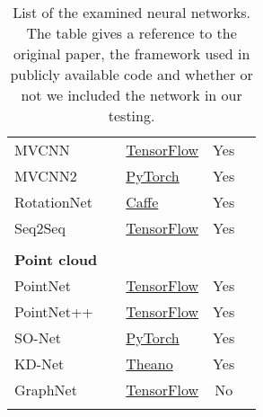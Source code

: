 \begin{table}[]
\begin{tabular}{lllcc}
		MVCNN                  & \cite{su_multi-view_2015}                & \href{https://github.com/WeiTang114/MVCNN-TensorFlow}{TensorFlow}                      &     Yes     &  \\
		MVCNN2                 & \cite{su_deeper_2018}                    & \href{https://github.com/jongchyisu/mvcnn_pytorch}{PyTorch}                            &     Yes     &  \\
		RotationNet            & \cite{kanezaki_rotationnet:_2018}        & \href{https://github.com/kanezaki/rotationnet}{Caffe}                                  &     Yes     &  \\
		Seq2Seq                & \cite{zhizhong_seqviews2seqlabels:_2018} & \href{https://github.com/mingyangShang/SeqViews2SeqLabels}{TensorFlow}                 &     Yes     &  \\
		                       &                                          &                                                                                        &             &  \\
		\textbf{Point cloud  } &                                          &                                                                                        &             &  \\
		PointNet               & \cite{qi_pointnet:_2016}                 & \href{https://github.com/charlesq34/pointnet}{TensorFlow}                              &     Yes     &  \\
		PointNet++             & \cite{qi_pointnet++:_2017}               & \href{https://github.com/charlesq34/pointnet2}{TensorFlow}                             &     Yes     &  \\
		SO-Net                 & \cite{li_so-net:_2018}                   & \href{https://github.com/lijx10/SO-Net}{PyTorch}                                       &     Yes     &  \\
		KD-Net                 & \cite{klokov_escape_2017}                & \href{https://github.com/Regenerator/kdnets}{Theano}                                   &     Yes     &  \\
		GraphNet               & \cite{dominguez_general-purpose_2018}    & \href{https://github.com/WDot/G3DNet}{TensorFlow}                                      &     No      &  \\
		                       &                                          &                                                                                        &             &  \\ \hline
	\end{tabular}
\caption{List of the examined neural networks. The table gives a reference to the original paper, the framework used in publicly available code and whether or not we included the network in our testing.}
\label{Table:1}
\end{table}